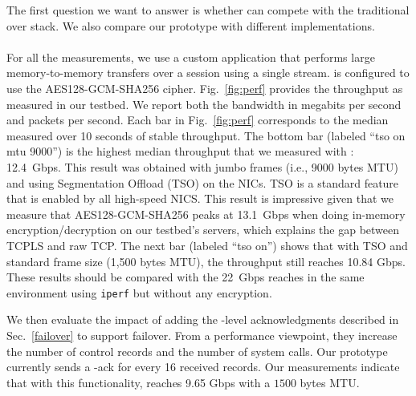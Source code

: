 The first question we want to answer is whether \tcpls can compete with the
traditional \tls over \tcp stack. We also compare our \tcpls prototype with
different \quic implementations.

\paragraph*{\tcpls}
For all the \tcpls measurements, we use a custom application that performs
large memory-to-memory transfers over a \tcpls session using a single stream.
\tcpls is configured to use the AES128-GCM-SHA256 cipher. Fig.~\ref{fig:perf}
provides the throughput as measured in our testbed. We report both the bandwidth in
megabits per second and packets per second. Each bar in Fig.~\ref{fig:perf}
corresponds to the median measured over 10 seconds of stable throughput. The
bottom bar (labeled ``\tcpls tso on mtu 9000'') is the highest median throughput
that we measured with \tcpls: 12.4~Gbps. This result was obtained with jumbo
frames (i.e., 9000 bytes MTU) and using \tcp Segmentation Offload (TSO) on the
NICs. TSO is a standard feature that is enabled by all high-speed NICS. This
result is impressive given that we measure that AES128-GCM-SHA256 peaks at
13.1~Gbps when doing in-memory encryption/decryption on our testbed's servers,
which explains the gap between TCPLS and raw TCP.
The next bar (labeled ``\tcpls tso on'') shows that with TSO and standard frame
size (1,500 bytes MTU), the throughput still reaches 10.84 Gbps. These
results should be compared with the 22~Gbps \tcp reaches in the same
environment using \texttt{iperf} but without any encryption.



We then evaluate the impact of adding the \tcpls-level acknowledgments
described in Sec.~\ref{failover} to support failover.
From a performance viewpoint, they increase the number of control records and
the number of system calls. Our prototype currently sends a \tcpls-ack for every
16 received records. Our measurements indicate that with this functionality,
\tcpls reaches 9.65 Gbps with a $1500$ bytes MTU.

